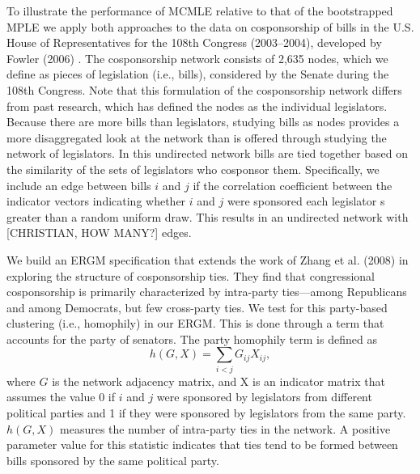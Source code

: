 \documentclass[10pt, conference, compsocconf]{IEEEtran}
\begin{document}
\noindent To illustrate the performance of MCMLE relative to that of the bootstrapped MPLE we apply both approaches to the data on cosponsorship of bills in the U.S. House of Representatives for the 108th Congress (2003--2004), developed by Fowler (2006) \cite{Fowler2006a} \cite{Fowler2006b}. The cosponsorship network consists of 2,635 nodes, which we define as pieces of legislation (i.e., bills), considered by the Senate during the 108th Congress. Note that this formulation of the cosponsorship network differs from past research, which has defined the nodes as the individual legislators. Because there are more bills than legislators, studying bills as nodes provides a more disaggregated look at the network than is offered through studying the network of legislators. In this undirected network bills are tied together based on the similarity of the sets of legislators who cosponsor them. Specifically, we include an edge between bills $i$ and $j$ if the correlation coefficient between the indicator vectors indicating whether $i$ and $j$ were sponsored each legislator s greater than a random uniform draw. This results in an undirected network with [CHRISTIAN, HOW MANY?] edges.

We build an ERGM specification that extends the work of  Zhang et al. (2008) \cite{zhang2008community} in exploring the structure of cosponsorship ties. They find that congressional cosponsorship is primarily characterized by intra-party ties---among Republicans and among Democrats, but few cross-party ties. We test for this party-based clustering (i.e., homophily) in our ERGM. This is done through a term that accounts for the party of senators. The party homophily term is defined as $$ h(G,X) = \sum_{i < j} G_{ij}X_{ij},$$ where $G$ is the network adjacency matrix, and X is an indicator matrix that assumes the value 0 if $i$ and $j$ were sponsored by legislators from different political parties and 1 if they were sponsored by legislators from the same party.  $h(G,X)$ measures the number of intra-party ties in the network. A positive parameter value for this statistic indicates that ties tend to be formed between bills sponsored by the same political party.
\end{document}
